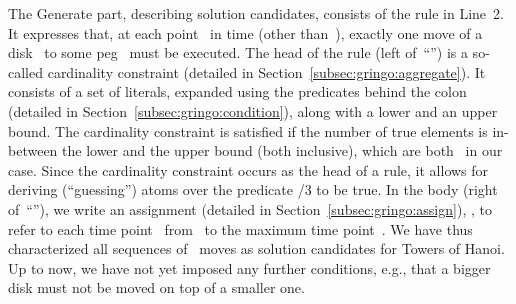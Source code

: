 The Generate part, describing solution candidates, consists of the rule in Line~2.
It expresses that,
at each point~ in time (other than~),
exactly one move of a disk~ to some peg~
must be executed.
The head of the rule (left of~``\code{:-}'')
is a so-called cardinality constraint (detailed in Section~\ref{subsec:gringo:aggregate}). 
It
consists of a set of literals,
expanded using the predicates behind the colon
(detailed in Section~\ref{subsec:gringo:condition}),
along with a lower and an upper bound.
The cardinality constraint is satisfied if %
the number of true elements
is in-between the lower and the upper bound (both inclusive),
which are both~ in our case.
Since the cardinality constraint occurs as the head of a rule,
it allows for deriving (``guessing'') atoms 
over the predicate /$3$ to be true.
In the body (right of~``\code{:-}''),
we write an assignment (detailed in Section~\ref{subsec:gringo:assign}),
,
to refer to each time point~
from~ to the maximum time point~. %
We have thus characterized all sequences of~ moves
as solution candidates for Towers of Hanoi.
Up to now, 
we have not yet imposed any further conditions, e.g.,
that a bigger disk must not be moved on top of a smaller one.

